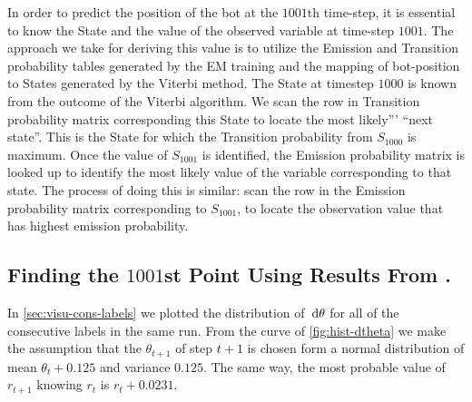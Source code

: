 \documentclass[twoside]{article}
\begin{document}
In order to predict the position of the bot at the $\num{1001}$th time-step, it is essential to know the State and the value of the observed variable at time-step $\num{1001}$.
The approach we take for deriving this value is to utilize the Emission and Transition probability tables generated by the EM training and the mapping of bot-position to States generated by the Viterbi method.
The State at timestep $\num{1000}$ is known from the outcome of the Viterbi algorithm.
We scan the row in Transition probability matrix corresponding this State to locate the most likely''' ``next state''.
This is the State for which the Transition probability from $S_{\num{1000}}$ is maximum.
Once the value of $S_{\num{1001}}$ is identified, the Emission probability matrix is looked up to identify the most likely value of the variable corresponding to that state.
The process of doing this is similar: scan the row in the Emission probability matrix corresponding to $S_{\num{1001}}$, to locate the observation value that has highest emission probability.

\subsection{Finding the $\num{1001}$st Point Using Results From .}\label{sec:finding-1001-angles}

In \cref{sec:visu-cons-labels} we plotted the distribution of~${\mathop{}\!\mathrm{d} \theta}$ for all of the consecutive labels in the same run.
From the curve of \cref{fig:hist-dtheta} we make the assumption that the $\theta_{t+1}$ of step ${t+1}$ is chosen form a normal distribution of mean ${\theta_t + 0.125}$ and variance $0.125$.
The same way, the most probable value of $r_{t+1}$ knowing $r_t$ is $r_t + 0.0231$.
\end{document}
